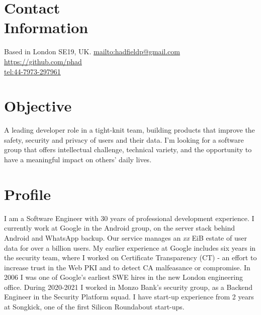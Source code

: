 \documentclass[line]{resume}
\begin{document}
\begin{resume}

    \section{\mysidestyle Contact\\Information}

    Based in London SE19, UK.              \hfill \url{mailto:hadfieldp@gmail.com}         \vspace{0mm}\\\vspace{0mm}%
                                           \hfill \url{https://github.com/phad}            \vspace{0mm}\\\vspace{0mm}%
                                           \hfill \url{tel:44-7973-297961}                 \vspace{0mm}\\\vspace{-4.5mm}%

    \section{\mysidestyle Objective}

    A leading developer role in a tight-knit team, building products that improve the safety, security and privacy of
    users and their data.  I'm looking for a software group that offers intellectual challenge, technical variety, and
    the opportunity to have a meaningful impact on others' daily lives.

    \section{\mysidestyle Profile}

    I am a Software Engineer with 30 years of professional development experience.  I currently work at Google in
    the Android group, on the server stack behind Android and WhatsApp backup.  Our service manages an \textsl{xx} EiB
    estate of user data for over a billion users. My earlier experience at Google includes six years in the security
    team, where I worked on Certificate Transparency (CT) - an effort to increase trust in the Web PKI and to detect CA
    malfeasance or compromise.  In 2006 I was one of Google's earliest SWE hires in the new London engineering office.
    During 2020-2021 I worked in Monzo Bank's security group, as a Backend Engineer in the Security Platform squad.  I
    have start-up experience from 2 years at Songkick, one of the first Silicon Roundabout start-ups.


\end{resume}
\end{document}
